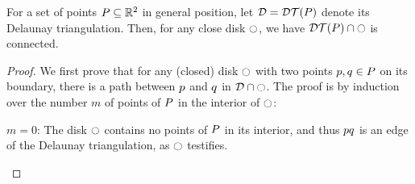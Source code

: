 \documentclass[12pt]{article}%
\begin{document}
\begin{claim}
    For a set of points $P \subseteq \mathbb{R}^2$ in general position, let
    $\DT = \DTX{\PS}$ denote its Delaunay triangulation.  Then, for
    any close disk $\ocircle$, we have $\restrictY{\DTX{\PS}}{\disk}$ is
    connected.
\end{claim}


\begin{proof}
    We first prove that for any (closed) disk $\ocircle$ with two points
    $p,q\in P$ on its boundary, there is a path between $p$
    and $q$ in $\mathcal{D} \cap {\ocircle}$.  The proof is by induction
    over the number $m$ of points of $P$ in the interior of $\ocircle$:
    \begin{compactitem}
        \item $m=0$: The disk $\ocircle$ contains no points of $P$ in
        its interior, and thus $p q$ is an edge of the Delaunay
        triangulation, as $\ocircle$ testifies.


\end{compactitem}
\end{proof}
\end{document}
